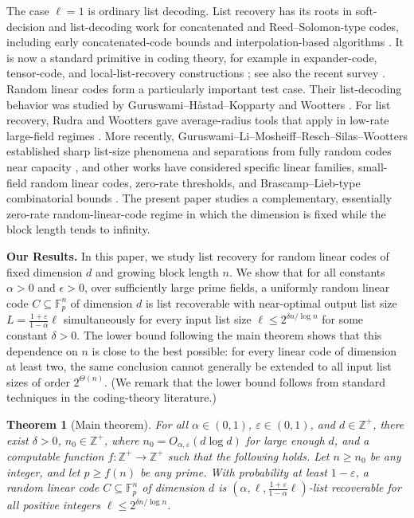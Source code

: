\documentclass{amsart}
\newtheorem{theorem}{Theorem}
\theoremstyle{definition}
\theoremstyle{remark}
\newcommand{\Fp}{\mathbb{F}_p}
\begin{document}
The case $\ell=1$ is ordinary list decoding. List recovery has its roots in soft-decision and list-decoding work for concatenated and Reed--Solomon-type codes, including early concatenated-code bounds and interpolation-based algorithms \cite{ZyablovPinsker,GuruswamiSudan}. It is now a standard primitive in coding theory, for example in expander-code, tensor-code, and local-list-recovery constructions \cite{HemenwayRonZewiWootters}; see also the recent survey \cite{ReschVenkitesh}. Random linear codes form a particularly important test case. Their list-decoding behavior was studied by Guruswami--H\aa stad--Kopparty and Wootters \cite{GuruswamiHastadKopparty,Wootters}. For list recovery, Rudra and Wootters gave average-radius tools that apply in low-rate large-field regimes \cite{RudraWootters}. More recently, Guruswami--Li--Mosheiff--Resch--Silas--Wootters established sharp list-size phenomena and separations from fully random codes near capacity \cite{GLMRSW}, and other works have considered specific linear families, small-field random linear codes, zero-rate thresholds, and Brascamp--Lieb-type combinatorial bounds \cite{LiShagrithaya,DoronMosheiffReschRibeiro,ReschYuanZhang,BrakensiekChenDharZhang}. The present paper studies a complementary, essentially zero-rate random-linear-code regime in which the dimension is fixed while the block length tends to infinity.

\textbf{Our Results.}
In this paper, we study list recovery for random linear codes of fixed dimension $d$ and growing block length $n$. We show that for all constants $\alpha>0$ and $\epsilon>0$, over sufficiently large prime fields, a uniformly random linear code $C \subseteq \Fp^n$ of dimension $d$ is list recoverable with near-optimal output list size $L=\frac{1+\varepsilon}{1-\alpha}\ell$ simultaneously for every input list size $\ell\le 2^{\delta n/\log n}$ for some constant $\delta>0$. The lower bound following the main theorem shows that this dependence on $n$ is close to the best possible: for every linear code of dimension at least two, the same conclusion cannot generally be extended to all
input list sizes of order $2^{\Theta(n)}$. (We remark that the lower bound follows from standard techniques in the coding-theory literature.)

\begin{theorem}[Main theorem]\label{thm:main}
    For all $\alpha \in (0,1)$, $\varepsilon \in (0,1)$, and $d \in \mathbb{Z}^+$, there exist $\delta > 0$, $n_0 \in \mathbb{Z}^+$, where 
$n_0=O_{\alpha,\varepsilon}(d\log d)$ for large enough $d$, and a computable function $f : \mathbb{Z}^+ \rightarrow \mathbb{Z}^+$ such that the following holds. Let $n \geq n_0$ be any integer, and let $p \geq f(n)$ be any prime. With probability at least $1 - \varepsilon$, a random linear code $C \subseteq \Fp^n$ of dimension $d$ is $(\alpha, \ell, \frac{1+\varepsilon}{1-\alpha}\ell)$-list recoverable for all positive integers $\ell \leq 2^{\delta n/\log n}$.
\end{theorem}
\end{document}
